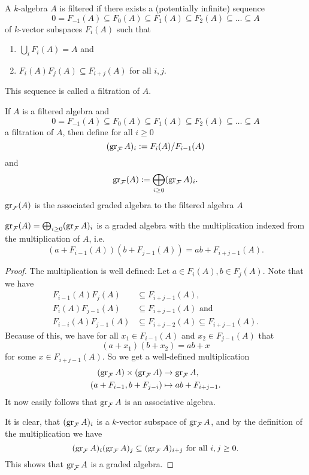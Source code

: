\begin{defi}
 A $k$-algebra $A$ is filtered if there exists a (potentially infinite) sequence
 \[
  0 = F_{-1}(A) \subseteq F_0(A) \subseteq F_1(A) \subseteq F_2(A) \subseteq \ldots \subseteq A
 \]
 of $k$-vector subspaces $F_i(A)$ such that
 \begin{enumerate}[1)]
  \item $\bigcup_i F_i(A) = A$ and
  \item $F_i(A) F_j(A) \subseteq F_{i+j}(A)$ for all $i,j$.
 \end{enumerate}
 This sequence is called a filtration of $A$.
\end{defi}


\begin{defi}
 If $A$ is a filtered algebra and
 \[
  0 = F_{-1}(A) \subseteq F_0(A) \subseteq F_1(A) \subseteq F_2(A) \subseteq \ldots \subseteq A
 \]
 a filtration of $A$, then define for all $i \geq 0$
 \[
  (\operatorname{gr}_\mathcal{F}A)_i := F_i(A)/F_{i-1}(A)
 \]
 and
 \[
  \operatorname{gr}_\mathcal{F}(A) := \bigoplus_{i \geq 0} (\operatorname{gr}_\mathcal{F}A)_i.
 \]
 $\operatorname{gr}_\mathcal{F}(A)$ is the associated graded algebra to the filtered algebra $A$
\end{defi}



\begin{lem}
 $\operatorname{gr}_\mathcal{F}(A) = \bigoplus_{i \geq 0} (\operatorname{gr}_\mathcal{F}A)_i$ is a graded algebra with the multiplication indexed from the multiplication of $A$, i.e.
 \[
  ( a + F_{i-1}(A) )( b + F_{j-1}(A) ) = ab + F_{i+j-1}(A).
 \]
\end{lem}
\begin{proof}
 The multiplication is well defined: Let $a \in F_i(A), b \in F_j(A)$. Note that we have
 \begin{align*}
  F_{i-1}(A)F_j(A) &\subseteq F_{i+j-1}(A), \\
  F_i(A) F_{j-1}(A) &\subseteq F_{i+j-1}(A) \text{ and } \\
  F_{i-i}(A)F_{j-1}(A) &\subseteq F_{i+j-2}(A) \subseteq F_{i+j-1}(A).
 \end{align*}
 Because of this, we have for all $x_1 \in F_{i-1}(A)$ and $x_2 \in F_{j-1}(A)$ that
 \[
  (a + x_1)(b + x_2) = a b + x
 \]
 for some $x \in F_{i+j-1}(A)$. So we get a well-defined multiplication
 \begin{align*}
  (\operatorname{gr}_\mathcal{F} A) \times (\operatorname{gr}_\mathcal{F} A) &\to \operatorname{gr}_\mathcal{F} A, \\
  (a + F_{i-1}, b + F_{j-i}) &\mapsto ab + F_{i+j-1}.
 \end{align*}
 It now easily follows that $\operatorname{gr}_\mathcal{F} A$ is an associative algebra.
 
 It is clear, that $(\operatorname{gr}_\mathcal{F} A)_i$ is a $k$-vector subspace of $\operatorname{gr}_\mathcal{F} A$, and by the definition of the multiplication we have
 \[
  (\operatorname{gr}_\mathcal{F} A)_i (\operatorname{gr}_\mathcal{F} A)_j \subseteq (\operatorname{gr}_\mathcal{F} A)_{i+j} \text{ for all } i,j \geq 0.
 \]
 This shows that $\operatorname{gr}_\mathcal{F} A$ is a graded algebra.
\end{proof}



